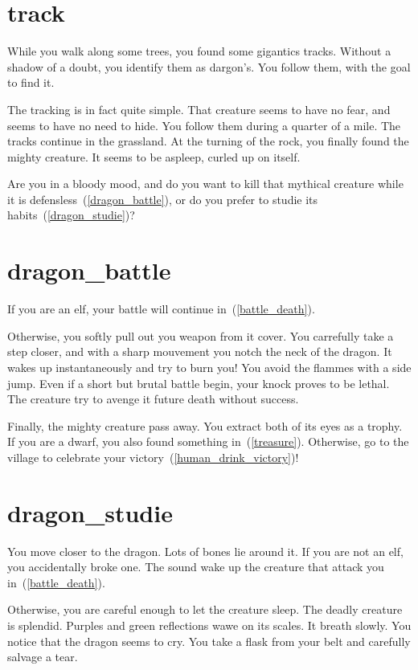 \section{track}

While you walk along some trees, you found some gigantics tracks. Without a
shadow of a doubt, you identify them as dargon's. You follow them, with
the goal to find it.

The tracking is in fact quite simple. That creature seems to have no fear, and
seems to have no need to hide. You follow them during a quarter of a mile. The
tracks continue in the grassland. At the turning of the rock, you finally found
the mighty creature. It seems to be aspleep, curled up on itself.

Are you in a bloody mood, and do you want to kill that mythical creature while it
is defensless~(\ref{dragon_battle}), or do you prefer to studie its
habits~(\ref{dragon_studie})?

\section{dragon_battle}

If you are an elf, your battle will continue in~(\ref{battle_death}).

\medbreak

Otherwise, you softly pull out you weapon from it cover. You carrefully take a
step closer, and with a sharp mouvement you notch the neck of the dragon. It wakes
up instantaneously and try to burn you! You avoid the flammes with a side jump.
Even if a short but brutal battle begin, your knock proves to be lethal. The
creature try to avenge it future death without success.

Finally, the mighty creature pass away. You extract both of its eyes as a
trophy. If you are a dwarf, you also found something in~(\ref{treasure}).
Otherwise, go to the village to celebrate your
victory~(\ref{human_drink_victory})!

\section{dragon_studie}

You move closer to the dragon. Lots of bones lie around it. If you are not an
elf, you accidentally broke one. The sound wake up the creature that attack you
in~(\ref{battle_death}).

\medbreak

Otherwise, you are careful enough to let the creature sleep. The deadly
creature is splendid. Purples and green reflections wawe on its scales. It
breath slowly. You notice that the dragon seems to cry. You take a flask from
your belt and carefully salvage a tear.

